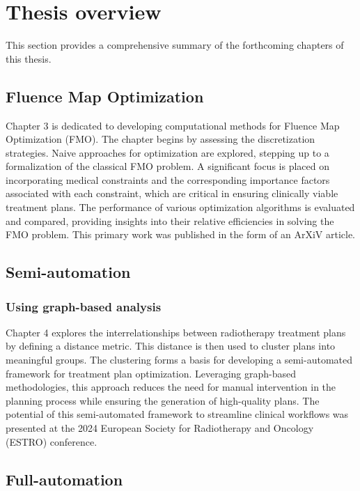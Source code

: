 \section{Thesis overview}
This section provides a comprehensive summary of the forthcoming chapters of this thesis.

\subsection{Fluence Map Optimization}
Chapter 3 is dedicated to developing computational methods for Fluence Map Optimization (FMO).
The chapter begins by assessing the discretization strategies.
Naive approaches for optimization are explored, stepping up to a formalization of the classical FMO problem.
A significant focus is placed on incorporating medical constraints and the corresponding importance factors associated with each constraint, which are critical in ensuring clinically viable treatment plans.
The performance of various optimization algorithms is evaluated and compared, providing insights into their relative efficiencies in solving the FMO problem.
This primary work was published in the form of an ArXiV article.

\subsection{Semi-automation}
\subsubsection*{Using graph-based analysis}
Chapter 4 explores the interrelationships between radiotherapy treatment plans by defining a distance metric.
This distance is then used to cluster plans into meaningful groups.
The clustering forms a basis for developing a semi-automated framework for treatment plan optimization.
Leveraging graph-based methodologies, this approach reduces the need for manual intervention in the planning process while ensuring the generation of high-quality plans.
The potential of this semi-automated framework to streamline clinical workflows was presented at the 2024 European Society for Radiotherapy and Oncology (ESTRO) conference.

\subsection{Full-automation}
